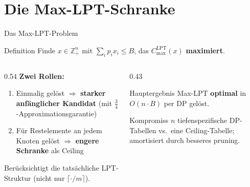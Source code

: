 \documentclass[fleqn,11pt,aspectratio=43]{beamer}
\newcommand{\Clpt}{C_{\max}^{\mathrm{LPT}}}
\begin{document}
\section{Die Max-LPT-Schranke}

\begin{frame}[shrink=8]{Das Max-LPT-Problem}
  \begin{block}{Definition}
    Finde $x\in\mathbb{Z}_+^n$ mit $\sum_i p_ix_i\leq B$, das $\Clpt(x)$ \textbf{maximiert}.
  \end{block}
  \begin{columns}[T]
    \begin{column}{0.54\textwidth}
      \textbf{Zwei Rollen:}
      \begin{enumerate}
        \item Einmalig gelöst $\Rightarrow$ \textbf{starker anfänglicher Kandidat} (mit $\tfrac34$-Approximationsgarantie)
        \item Für Restelemente an jedem Knoten gelöst $\Rightarrow$ \textbf{engere Schranke} als Ceiling
      \end{enumerate}
      Berücksichtigt die tatsächliche LPT-Struktur (nicht nur $\lceil\cdot/m\rceil$).
    \end{column}
    \begin{column}{0.43\textwidth}
      \begin{alertblock}{Hauptergebnis}
        Max-LPT \textbf{optimal} in $O(n\cdot B)$ per DP gelöst.
      \end{alertblock}
      \begin{block}{Kompromiss}
        \small $n$ tiefenspezifische DP-Tabellen vs.\ eine Ceiling-Tabelle; amortisiert durch besseres pruning.
      \end{block}
    \end{column}
  \end{columns}
\end{frame}
\end{document}
